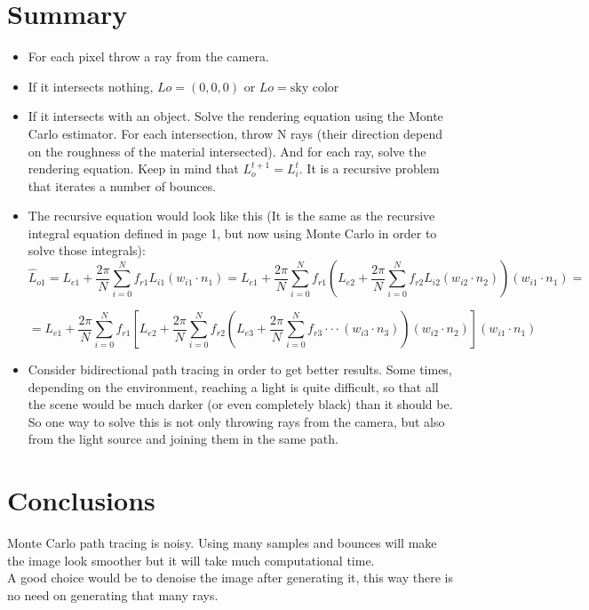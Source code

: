 \documentclass{article}
\begin{document}
\section{Summary}

\begin{itemize}
  \item For each pixel throw a ray from the camera.
  \item If it intersects nothing, $L{o} = (0,0,0)$ or $L{o} = \text{sky color}$
  \item If it intersects with an object. Solve the rendering equation using the Monte Carlo estimator. For each intersection, throw N rays (their direction depend on the roughness of the material intersected). And for each ray, solve the rendering equation. Keep in mind that $L_{o}^{t+1} = L_{i}^{t}$. It is a recursive problem that iterates a number of bounces.
  \item The recursive equation would look like this (It is the same as the recursive integral equation defined in page 1, but now using Monte Carlo in order to solve those integrals):
  $$\hat{L}_{o1} = L_{e1} + \frac{2\pi}{N}\sum_{i=0}^{N}f_{r1}L_{i1} \left ( w_{i1} \cdot n_{1} \right ) =  L_{e1} + \frac{2\pi}{N}\sum_{i=0}^{N}f_{r1} \left(  L_{e2} + \frac{2\pi}{N}\sum_{i=0}^{N}f_{r2}L_{i2} \left ( w_{i2} \cdot n_{2} \right ) \right) \left ( w_{i1} \cdot n_{1} \right )=$$

  $$=L_{e1} + \frac{2\pi}{N}\sum_{i=0}^{N}f_{r1} \left[  L_{e2} + \frac{2\pi}{N}\sum_{i=0}^{N}f_{r2} \left( L_{e3} + \frac{2\pi}{N }\sum_{i=0}^{N}f_{r3} \cdot \cdot \cdot \left ( w_{i3} \cdot n_{3} \right ) \right) \left ( w_{i2} \cdot n_{2} \right ) \right] \left ( w_{i1} \cdot n_{1} \right )$$
  \item Consider bidirectional path tracing in order to get better results. Some times, depending on the environment, reaching a light is quite difficult, so that all the scene would be much darker (or even completely black) than it should be. So one way to solve this is not only throwing rays from the camera, but also from the light source and joining them in the same path. 
\end{itemize}

\section{Conclusions}

Monte Carlo path tracing is noisy. Using many samples and bounces will make the image look smoother but it will take much computational time.
\\
A good choice would be to denoise the image after generating it, this way there is no need on generating that many rays.
\end{document}
